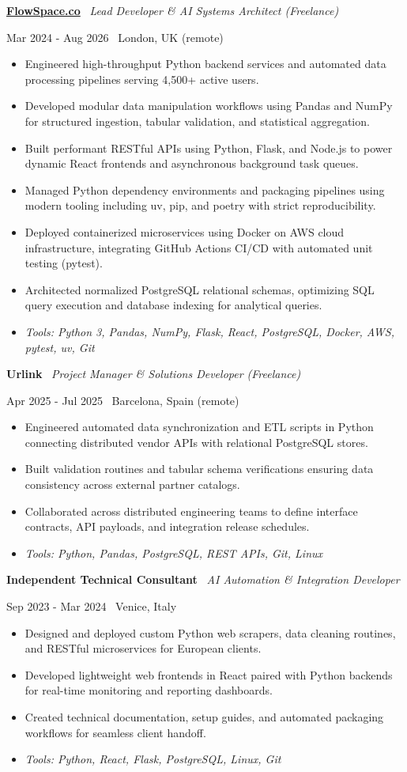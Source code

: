 \documentclass[a4paper,10pt]{article}
\newcommand{\role}[4]{%
  \vspace{2pt}\noindent
  \begin{minipage}[t]{0.70\textwidth}\raggedright\textbf{#1} \textbullet\ \textit{#3}\end{minipage}%
  \hfill
  \begin{minipage}[t]{0.28\textwidth}\raggedleft\footnotesize\color{gray}#2 \textbullet\ #4\end{minipage}%
  \vspace{1pt}%
}
\begin{document}
\role{\href{https://flowspace.co}{FlowSpace.co}}{Mar 2024 - Aug 2026}{Lead Developer \& AI Systems Architect (Freelance)}{London, UK (remote)}
\begin{itemize}
  \item Engineered high-throughput Python backend services and automated data processing pipelines serving 4,500+ active users.
  \item Developed modular data manipulation workflows using Pandas and NumPy for structured ingestion, tabular validation, and statistical aggregation.
  \item Built performant RESTful APIs using Python, Flask, and Node.js to power dynamic React frontends and asynchronous background task queues.
  \item Managed Python dependency environments and packaging pipelines using modern tooling including uv, pip, and poetry with strict reproducibility.
  \item Deployed containerized microservices using Docker on AWS cloud infrastructure, integrating GitHub Actions CI/CD with automated unit testing (pytest).
  \item Architected normalized PostgreSQL relational schemas, optimizing SQL query execution and database indexing for analytical queries.
  \item \textit{Tools: Python 3, Pandas, NumPy, Flask, React, PostgreSQL, Docker, AWS, pytest, uv, Git}
\end{itemize}

\role{Urlink}{Apr 2025 - Jul 2025}{Project Manager \& Solutions Developer (Freelance)}{Barcelona, Spain (remote)}
\begin{itemize}
  \item Engineered automated data synchronization and ETL scripts in Python connecting distributed vendor APIs with relational PostgreSQL stores.
  \item Built validation routines and tabular schema verifications ensuring data consistency across external partner catalogs.
  \item Collaborated across distributed engineering teams to define interface contracts, API payloads, and integration release schedules.
  \item \textit{Tools: Python, Pandas, PostgreSQL, REST APIs, Git, Linux}
\end{itemize}

\role{Independent Technical Consultant}{Sep 2023 - Mar 2024}{AI Automation \& Integration Developer}{Venice, Italy}
\begin{itemize}
  \item Designed and deployed custom Python web scrapers, data cleaning routines, and RESTful microservices for European clients.
  \item Developed lightweight web frontends in React paired with Python backends for real-time monitoring and reporting dashboards.
  \item Created technical documentation, setup guides, and automated packaging workflows for seamless client handoff.
  \item \textit{Tools: Python, React, Flask, PostgreSQL, Linux, Git}
\end{itemize}
\end{document}
